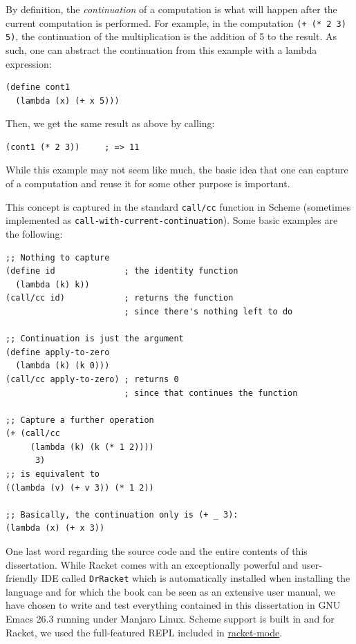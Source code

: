 By definition, the \emph{continuation} of a computation is what will happen
after the current computation is performed. For example, in the computation
\texttt{(+ (* 2 3) 5)}, the continuation of the multiplication is the addition
of 5 to the result. As such, one can abstract the continuation from this example
with a lambda expression:
{\small
\begin{verbatim}
(define cont1
  (lambda (x) (+ x 5)))
\end{verbatim}
}
Then, we get the same result as above by calling:
{\small
\begin{verbatim}
(cont1 (* 2 3))     ; => 11
\end{verbatim}
}
While this example may not seem like much, the basic idea that one can capture
 of a computation and reuse it for some other purpose is important.

This concept is captured in the standard \texttt{call/cc} function in Scheme
(sometimes implemented as \texttt{call-with-current-continuation}). Some basic
examples are the following:
{
  \small
\begin{verbatim}
;; Nothing to capture
(define id              ; the identity function
  (lambda (k) k))
(call/cc id)            ; returns the function
                        ; since there's nothing left to do

;; Continuation is just the argument
(define apply-to-zero
  (lambda (k) (k 0)))
(call/cc apply-to-zero) ; returns 0
                        ; since that continues the function

;; Capture a further operation
(+ (call/cc 
     (lambda (k) (k (* 1 2))))
      3)
;; is equivalent to
((lambda (v) (+ v 3)) (* 1 2))

;; Basically, the continuation only is (+ _ 3):
(lambda (x) (+ x 3))
\end{verbatim}
}




\vspace{0.3cm}

One last word regarding the source code and the entire contents of this
dissertation. While Racket comes with an exceptionally powerful and user-friendly
IDE called \texttt{DrRacket} which is automatically installed when installing
the language and for which the book \cite{htdp} can be seen as an extensive
user manual, we have chosen to write and test everything contained in this
dissertation in GNU Emacs 26.3 running under Manjaro Linux. Scheme support is
built in and for Racket, we used the full-featured REPL included in
\href{https://www.racket-mode.com/}{racket-mode}.

